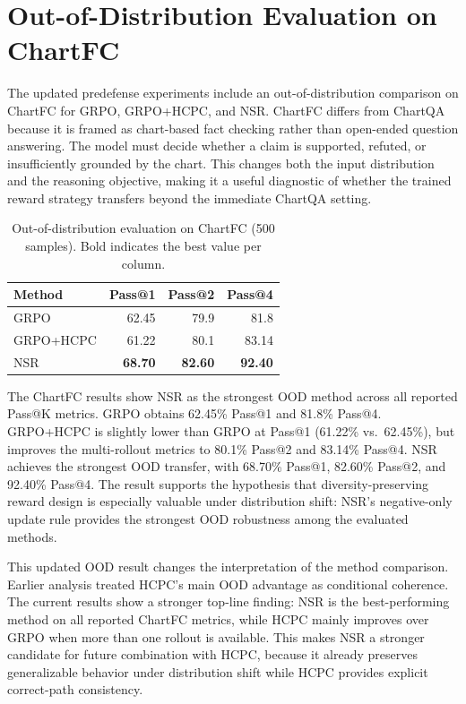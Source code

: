 \documentclass{iutbscthesis}
\begin{document}
\section{Out-of-Distribution Evaluation on ChartFC}

The updated predefense experiments include an out-of-distribution comparison on ChartFC for GRPO, GRPO+HCPC, and NSR. ChartFC differs from ChartQA because it is framed as chart-based fact checking rather than open-ended question answering. The model must decide whether a claim is supported, refuted, or insufficiently grounded by the chart. This changes both the input distribution and the reasoning objective, making it a useful diagnostic of whether the trained reward strategy transfers beyond the immediate ChartQA setting.

\begin{table}[H]
    \centering
    \small
    \begin{tabular}{lrrr}
        \toprule
        Method & Pass@1 & Pass@2 & Pass@4 \\
        \midrule
        GRPO & 62.45 & 79.9 & 81.8 \\
        GRPO+HCPC & 61.22 & 80.1 & 83.14 \\
        NSR & \textbf{68.70} & \textbf{82.60} & \textbf{92.40} \\
        \bottomrule
    \end{tabular}
    \caption{Out-of-distribution evaluation on ChartFC (500 samples). Bold indicates the best value per column.}
    \label{tab:chartfc_results}
\end{table}

The ChartFC results show NSR as the strongest OOD method across all reported Pass@K metrics. GRPO obtains 62.45\% Pass@1 and 81.8\% Pass@4. GRPO+HCPC is slightly lower than GRPO at Pass@1 (61.22\% vs.\ 62.45\%), but improves the multi-rollout metrics to 80.1\% Pass@2 and 83.14\% Pass@4. NSR achieves the strongest OOD transfer, with 68.70\% Pass@1, 82.60\% Pass@2, and 92.40\% Pass@4. The result supports the hypothesis that diversity-preserving reward design is especially valuable under distribution shift: NSR's negative-only update rule provides the strongest OOD robustness among the evaluated methods.

This updated OOD result changes the interpretation of the method comparison. Earlier analysis treated HCPC's main OOD advantage as conditional coherence. The current results show a stronger top-line finding: NSR is the best-performing method on all reported ChartFC metrics, while HCPC mainly improves over GRPO when more than one rollout is available. This makes NSR a stronger candidate for future combination with HCPC, because it already preserves generalizable behavior under distribution shift while HCPC provides explicit correct-path consistency.
\end{document}
